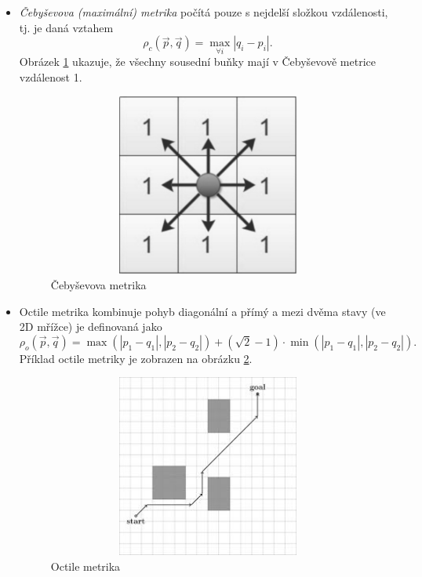 \begin{itemize}
	\item \emph{Čebyševova (maximální) metrika} počítá pouze s nejdelší složkou vzdálenosti, tj. je daná vztahem
	\begin{equation}
	\rho_c\left(\vec{p},\vec{q}\right)=\max_{\forall i}\left|q_i-p_i\right|.
	\end{equation}
	Obrázek \ref{obr:chebyshev} ukazuje, že všechny sousední buňky mají v Čebyševově metrice vzdálenost 1.
	
	\begin{figure}[htb]
		\begin{center}
			\includegraphics*[width=15cm,height=6cm,keepaspectratio]{obr/chebyshev}
		\end{center}
		\caption{Čebyševova metrika}
		\label{obr:chebyshev}
	\end{figure}
	
	\item Octile metrika kombinuje pohyb  diagonální a přímý a mezi dvěma stavy (ve 2D mřížce) je definovaná jako
	\begin{equation} \rho_o\left(\vec{p},\vec{q}\right)=\max\left(\left|p_1-q_1\right|,\left|p_2-q_2\right|\right)+(\sqrt{2}-1)\cdot \min\left(\left|p_1-q_1\right|,\left|p_2-q_2\right|\right).
	\end{equation}
	Příklad octile metriky je zobrazen na obrázku \ref{obr:octile}.
	
	\begin{figure}[htb]
		\begin{center}
			\includegraphics*[width=15cm,height=6cm,keepaspectratio]{obr/octile}
		\end{center}
		\caption{Octile metrika}
		\label{obr:octile}
	\end{figure}
	
\end{itemize} 

